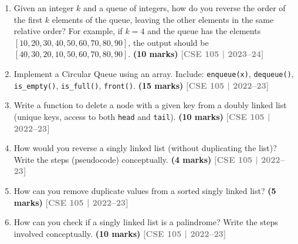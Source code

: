 \documentclass[12pt,a3paper]{article}
\newcommand{\yr}[1]{\hfill\textcolor{gray}{\small\textbf{[#1]}}}
\newcommand{\mk}[1]{\textcolor{orange!70!black}{\small\textbf{(#1 marks)}}}
\begin{document}
\begin{enumerate}

\item Given an integer $k$ and a queue of integers, how do you reverse the order of the first $k$ elements of the queue, leaving the other elements in the same relative order? For example, if $k = 4$ and the queue has the elements $[10, 20, 30, 40, 50, 60, 70, 80, 90]$, the output should be $[40, 30, 20, 10, 50, 60, 70, 80, 90]$. \mk{10}
\yr{CSE 105 | 2023--24}

\item Implement a Circular Queue using an array. Include: \texttt{enqueue(x)},
\texttt{dequeue()}, \texttt{is\_empty()}, \texttt{is\_full()}, \texttt{front()}.
\mk{15}
\yr{CSE 105 | 2022--23}

\item Write a function to delete a node with a given key from a doubly linked
list (unique keys, access to both \texttt{head} and \texttt{tail}). \mk{10}
\yr{CSE 105 | 2022--23}

\item How would you reverse a singly linked list (without duplicating the list)?
Write the steps (pseudocode) conceptually. \mk{4}
\yr{CSE 105 | 2022--23}

\item How can you remove duplicate values from a sorted singly linked list?
\mk{5}
\yr{CSE 105 | 2022--23}

\item How can you check if a singly linked list is a palindrome? Write the steps
involved conceptually. \mk{10}
\yr{CSE 105 | 2022--23}


\end{enumerate}
\end{document}
